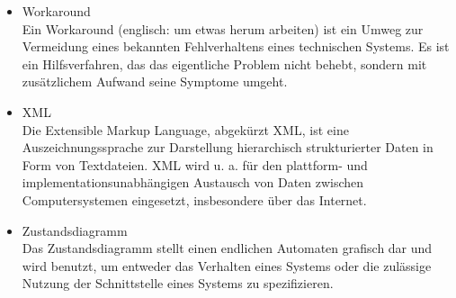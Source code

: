 \begin{itemize}
\item 	Workaround \\ Ein Workaround (englisch: um etwas herum arbeiten) ist ein Umweg zur Vermeidung eines bekannten Fehlverhaltens eines technischen Systems. Es ist ein Hilfsverfahren, das das eigentliche Problem nicht behebt, sondern mit zusätzlichem Aufwand seine Symptome umgeht.
\item 	XML \\ Die Extensible Markup Language, abgekürzt XML, ist eine Auszeichnungssprache zur Darstellung hierarchisch strukturierter Daten in Form von Textdateien. XML wird u. a. für den plattform- und implementationsunabhängigen Austausch von Daten zwischen Computersystemen eingesetzt, insbesondere über das Internet.
\item 	Zustandsdiagramm \\ Das Zustandsdiagramm stellt einen endlichen Automaten grafisch dar und wird benutzt, um entweder das Verhalten eines Systems oder die zulässige Nutzung der Schnittstelle eines Systems zu spezifizieren.
\end{itemize}